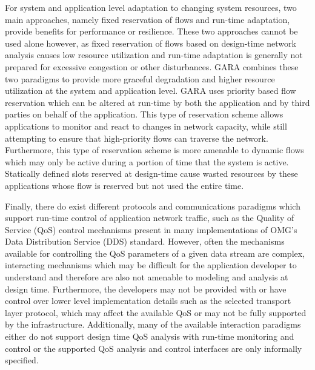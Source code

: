 For system and application level adaptation to changing system
resources, two main approaches, namely fixed reservation of flows and
run-time adaptation, provide benefits for performance or resilience.
These two approaches cannot be used alone however, as fixed
reservation of flows based on design-time network analysis causes low
resource utilization and run-time adaptation is generally not prepared
for excessive congestion or other disturbances.  GARA
\cite{Foster2000} combines these two paradigms to provide more
graceful degradation and higher resource utilization at the system and
application level.  GARA uses priority based flow reservation which
can be altered at run-time by both the application and by third
parties on behalf of the application.  This type of reservation scheme
allows applications to monitor and react to changes in network
capacity, while still attempting to ensure that high-priority flows
can traverse the network.  Furthermore, this type of reservation
scheme is more amenable to dynamic flows which may only be active
during a portion of time that the system is active.  Statically
defined slots reserved at design-time cause wasted resources by these
applications whose flow is reserved but not used the entire time.


Finally, there do exist different protocols and communications
paradigms which support run-time control of application network
traffic, such as the Quality of Service (QoS) control mechanisms
present in many implementations of OMG's Data Distribution Service
(DDS) standard\cite{OMG-DDS:07}\cite{OpenDDS:07}.  However, often the
mechanisms available for controlling the QoS parameters of a given
data stream are complex, interacting mechanisms which may be difficult
for the application developer to understand and therefore are also not
amenable to modeling and analysis at design
time\cite{Hoffert:2010:AED:1862821.1862825}.  Furthermore, the
developers may not be provided with or have control over lower level
implementation details such as the selected transport layer protocol,
which may affect the available QoS or may not be fully supported by
the infrastructure.  Additionally, many of the available interaction
paradigms either do not support design time QoS analysis with run-time
monitoring and control or the supported QoS analysis and control
interfaces are only informally specified.
